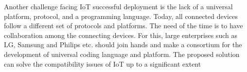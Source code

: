 \documentclass[10pt]{beamer}
\begin{document}
\begin{frame}{}


Another challenge facing IoT successful deployment is the
lack of a universal platform, protocol, and a programming
language. Today, all connected devices follow a different set
of protocols and platforms. The need of the time is to have
collaboration among the connecting devices. For this, large
enterprises such as LG, Samsung and Philips etc. should join
hands and make a consortium for the development of universal coding language and platform. The proposed solution
can solve the compatibility issues of IoT up to a significant
extent

\end{frame} 
\end{document}

